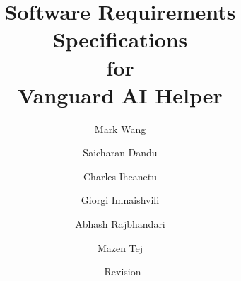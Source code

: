 \documentclass{extarticle}
\title{Software Requirements Specifications \\ for \\ Vanguard AI Helper}
\date{\DTMtoday\ Revision}
\author{Mark Wang
\and Saicharan Dandu
\and Charles Iheanetu
\and Giorgi Imnaishvili
\and Abhash Rajbhandari
\and Mazen Tej}
\begin{document}
\maketitle
\pagebreak

\tableofcontents
\pagebreak
\end{document}
